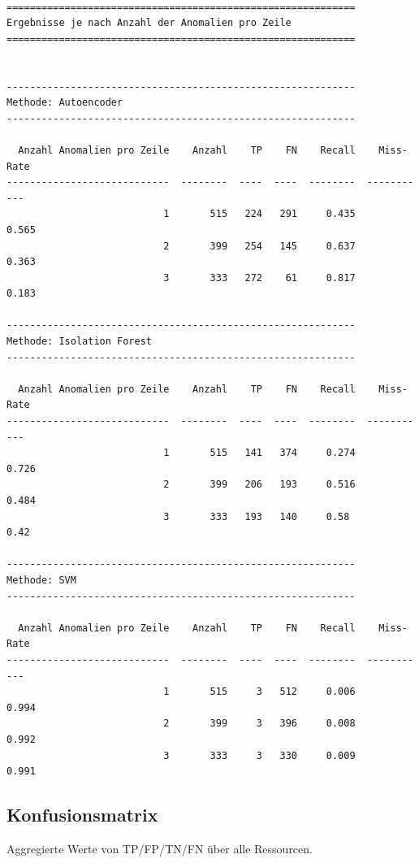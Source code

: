 \documentclass[11pt]{article}
\begin{document}
    \begin{Verbatim}[commandchars=\\\{\}]

============================================================
Ergebnisse je nach Anzahl der Anomalien pro Zeile
============================================================


------------------------------------------------------------
Methode: Autoencoder
------------------------------------------------------------

  Anzahl Anomalien pro Zeile    Anzahl    TP    FN    Recall    Miss-Rate
----------------------------  --------  ----  ----  --------  -----------
                           1       515   224   291     0.435        0.565
                           2       399   254   145     0.637        0.363
                           3       333   272    61     0.817        0.183

------------------------------------------------------------
Methode: Isolation Forest
------------------------------------------------------------

  Anzahl Anomalien pro Zeile    Anzahl    TP    FN    Recall    Miss-Rate
----------------------------  --------  ----  ----  --------  -----------
                           1       515   141   374     0.274        0.726
                           2       399   206   193     0.516        0.484
                           3       333   193   140     0.58         0.42

------------------------------------------------------------
Methode: SVM
------------------------------------------------------------

  Anzahl Anomalien pro Zeile    Anzahl    TP    FN    Recall    Miss-Rate
----------------------------  --------  ----  ----  --------  -----------
                           1       515     3   512     0.006        0.994
                           2       399     3   396     0.008        0.992
                           3       333     3   330     0.009        0.991
    \end{Verbatim}

    \subsection{Konfusionsmatrix}\label{konfusionsmatrix}

Aggregierte Werte von TP/FP/TN/FN über alle Ressourcen.
\end{document}
